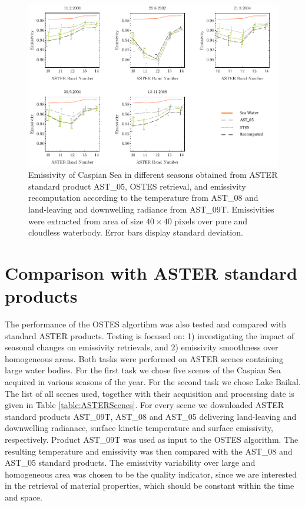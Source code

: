 \begin{figure}[!t]
\centering
\includegraphics[width=0.95\linewidth]{pics/Chapter_04/Caspian.pdf}
\vspace{1.5 em}
\caption{Emissivity of Caspian Sea in different seasons obtained from ASTER standard product AST\_05, OSTES retrieval, and emissivity recomputation according to the temperature from AST\_08 and land-leaving and downwelling radiance from AST\_09T. Emissivities were extracted from area of size $40 \times 40$ pixels over pure and cloudless waterbody. Error bars display standard deviation.}
\label{fig:CaspianSeaEmissivity}
\end{figure}

\section{Comparison with ASTER standard products}

The performance of the OSTES algortihm was also tested and compared with standard ASTER products. Testing is focused on: 1) investigating the impact of seasonal changes on emissivity retrievals, and 2) emissivity smoothness over homogeneous areas. Both tasks were performed on ASTER scenes containing large water bodies. For the first task we chose five scenes of the Caspian Sea acquired in various seasons of the year. For the second task we chose Lake Baikal. The list of all scenes used, together with their acquisition and processing date is given in Table \ref{table:ASTERScenes}. For every scene we downloaded ASTER standard products AST\_09T, AST\_08 and AST\_05 delivering land-leaving and downwelling radianace, surface kinetic temperature and surface emissivity, respectively. Product AST\_09T was used as input to the OSTES algorithm. The resulting temperature and emissivity was then compared with the AST\_08 and AST\_05 standard products. The emissivity variability over large and homogeneous area was chosen to be the quality indicator, since we are interested in the retrieval of material properties, which should be constant within the time and space.

